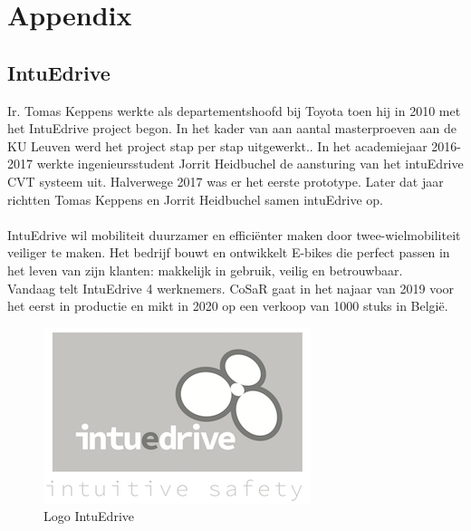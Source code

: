 \chapter*{Appendix}
\section*{IntuEdrive}
Ir. Tomas Keppens werkte als departementshoofd bij Toyota toen hij in 2010 met het IntuEdrive project begon. In het kader van aan aantal masterproeven aan de KU Leuven werd het project stap per stap uitgewerkt.. In het academiejaar 2016-2017 werkte ingenieursstudent Jorrit Heidbuchel de aansturing van het intuEdrive CVT systeem uit. Halverwege 2017 was er het eerste prototype. Later dat jaar richtten Tomas Keppens en Jorrit Heidbuchel samen intuEdrive op.
\\\\
IntuEdrive wil mobiliteit duurzamer en efficiënter maken door twee-wielmobiliteit veiliger te maken. Het bedrijf bouwt en ontwikkelt E-bikes die perfect passen in het leven van zijn klanten: makkelijk in gebruik, veilig en betrouwbaar.
\\
Vandaag telt IntuEdrive 4 werknemers. CoSaR gaat in het najaar van 2019 voor het eerst in productie en mikt in 2020 op een verkoop van 1000 stuks in België.
\begin{figure}[h]
  \centering
  \includegraphics[width=0.5\linewidth]{images/logo_intuedrive.png}
  \caption{Logo IntuEdrive}
  \label{fig:Logo IntuEdrive}
\end{figure}
\newpage
